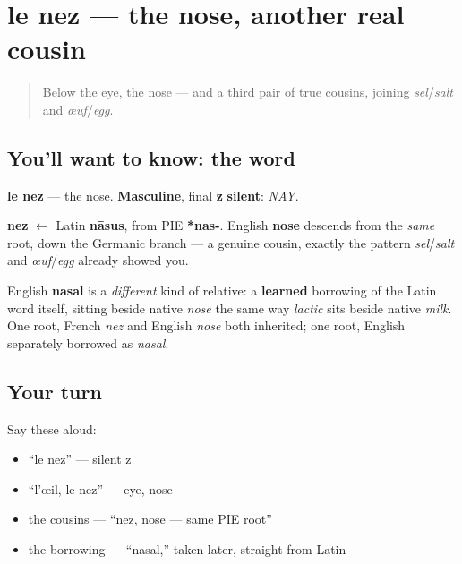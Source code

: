 \section[le nez]{le nez — the nose, another real cousin}

\label{lesson:FR-C31-nez}



\begin{quote}
Below the eye, the nose — and a third pair of true cousins, joining \emph{sel}/\emph{salt} and \emph{œuf}/\emph{egg}.
\end{quote}

\subsection*{You'll want to know: the word}
\textbf{le nez} — the nose. \textbf{Masculine}, final \textbf{z} \textbf{silent}: \emph{NAY}.

\begin{cousinweb}
\textbf{nez} $\leftarrow$ Latin \textbf{nāsus}, from PIE \textbf{*nas-}. English \textbf{nose} descends from the \emph{same} root, down the Germanic branch — a genuine cousin, exactly the pattern \emph{sel}/\emph{salt} and \emph{œuf}/\emph{egg} already showed you.

English \textbf{nasal} is a \emph{different} kind of relative: a \textbf{learned} borrowing of the Latin word itself, sitting beside native \emph{nose} the same way \emph{lactic} sits beside native \emph{milk}. One root, French \emph{nez} and English \emph{nose} both inherited; one root, English separately borrowed as \emph{nasal}.
\end{cousinweb}

\subsection*{Your turn}
Say these aloud:

\begin{itemize}
\raggedright
  \item \textquotedblleft{}le nez\textquotedblright{} — silent z
  \item \textquotedblleft{}l'œil, le nez\textquotedblright{} — eye, nose
  \item the cousins — \textquotedblleft{}nez, nose — same PIE root\textquotedblright{}
  \item the borrowing — \textquotedblleft{}nasal,\textquotedblright{} taken later, straight from Latin
\end{itemize}

